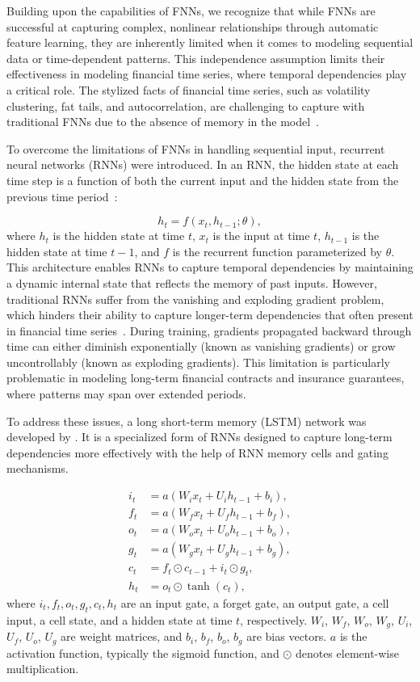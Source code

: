 Building upon the capabilities of FNNs, we recognize that while FNNs are successful at capturing complex, nonlinear relationships through automatic feature learning, they are inherently limited when it comes to modeling sequential data or time-dependent patterns. 
This independence assumption limits their effectiveness in modeling financial time series, where temporal dependencies play a critical role. 
The stylized facts of financial time series, such as volatility clustering, fat tails, and autocorrelation, are challenging to capture with traditional FNNs due to the absence of memory in the model~\citep{cont2001empirical}.

To overcome the limitations of FNNs in handling sequential input, recurrent neural networks (RNNs) were introduced.
In an RNN, the hidden state at each time step is a function of both the current input and the hidden state from the previous time period~\citep{elman1990finding}:

\begin{equation}
    h_t = f(x_t, h_{t-1}; \theta),
\end{equation}
where $h_t$ is the hidden state at time $t$, $x_t$ is the input at time $t$, $h_{t-1}$ is the hidden state at time $t-1$, and $f$ is the recurrent function parameterized by $\theta$.
This architecture enables RNNs to capture temporal dependencies by maintaining a dynamic internal state that reflects the memory of past inputs.
However, traditional RNNs suffer from the vanishing and exploding gradient problem, which hinders their ability to capture longer-term dependencies that often present in financial time series~\citep{bengio1994learning}.
During training, gradients propagated backward through time can either diminish exponentially (known as vanishing gradients) or grow uncontrollably (known as exploding gradients).
This limitation is particularly problematic in modeling long-term financial contracts and insurance guarantees, where patterns may span over extended periods.

To address these issues, a long short-term memory (LSTM) network was developed by \citet{hochreiter1997long}.
It is a specialized form of RNNs designed to capture long-term dependencies more effectively with the help of RNN memory cells and gating mechanisms.

\begin{align*}
    i_t &= a(W_i x_t + U_i h_{t-1} + b_i), \\
    f_t &= a(W_f x_t + U_f h_{t-1} + b_f), \\
    o_t &= a(W_o x_t + U_o h_{t-1} + b_o), \\
    g_t &= a(W_g x_t + U_g h_{t-1} + b_g), \\
    c_t &= f_t \odot c_{t-1} + i_t \odot g_t, \\
    h_t &= o_t \odot \tanh(c_t),
\end{align*}
where $i_t, f_t, o_t, g_t, c_t, h_t$ are an input gate, a forget gate, an output gate, a cell input, a cell state, and a hidden state at time $t$, respectively.
$W_i$, $W_f$, $W_o$, $W_g$, $U_i$, $U_f$, $U_o$, $U_g$ are weight matrices, and $b_i$, $b_f$, $b_o$, $b_g$ are bias vectors.
$a$ is the activation function, typically the sigmoid function, and $\odot$ denotes element-wise multiplication.

